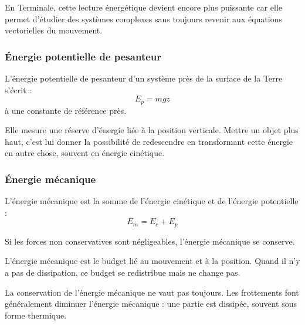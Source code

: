 \documentclass[11pt,a4paper]{article}
\begin{document}
\begin{terminalebox}
En Terminale, cette lecture énergétique devient encore plus puissante car elle permet d'étudier des systèmes complexes sans toujours revenir aux équations vectorielles du mouvement.
\end{terminalebox}

\subsubsection{Énergie potentielle de pesanteur}

\begin{definitionbox}
L'énergie potentielle de pesanteur d'un système près de la surface de la Terre s'écrit :
\[
E_p=mgz
\]
à une constante de référence près.
\end{definitionbox}

\begin{sensbox}
Elle mesure une réserve d'énergie liée à la position verticale.  
Mettre un objet plus haut, c'est lui donner la possibilité de redescendre en transformant cette énergie en autre chose, souvent en énergie cinétique.
\end{sensbox}

\subsubsection{Énergie mécanique}

\begin{definitionbox}
L'énergie mécanique est la somme de l'énergie cinétique et de l'énergie potentielle :
\[
E_m=E_c+E_p
\]
\end{definitionbox}

\begin{proprbox}
Si les forces non conservatives sont négligeables, l'énergie mécanique se conserve.
\end{proprbox}

\begin{sensbox}
L'énergie mécanique est le budget lié au mouvement et à la position.  
Quand il n'y a pas de dissipation, ce budget se redistribue mais ne change pas.
\end{sensbox}

\begin{attentionbox}
La conservation de l'énergie mécanique ne vaut pas toujours.  
Les frottements font généralement diminuer l'énergie mécanique : une partie est dissipée, souvent sous forme thermique.
\end{attentionbox}
\end{document}

